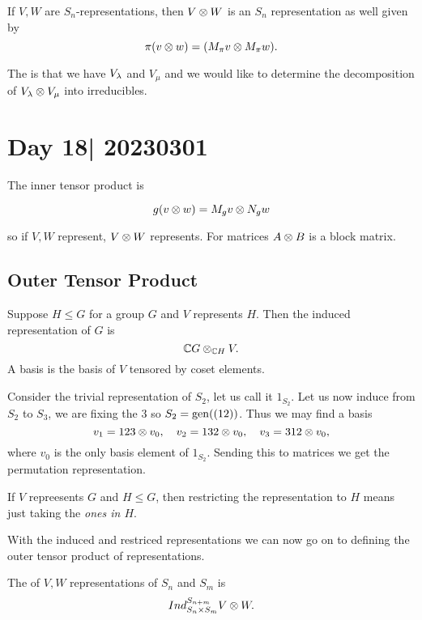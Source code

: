 \documentclass[12pt]{memoir}
\begin{document}
\begin{Prop}
    If $V,W$ are $S_n$-representations, then $V\otimes W$ is an $S_n$ representation as well given by 
    $$\pi(v\otimes w)=(M_\pi v\otimes M_\pi w).$$
\end{Prop}

The  is that we have $V_\lambda$ and $V_\mu$ and we would like to determine the decomposition of $V_\lambda\otimes V_\mu$ into irreducibles.

\section{Day 18| 20230301}

The inner tensor product is 

$$g(v\otimes w)=M_gv\otimes N_gw$$

so if $V,W$ represent, $V\otimes W$ represents. For matrices $A\otimes B$ is a block matrix.

\subsection{Outer Tensor Product}

\begin{Def}
    Suppose $H\leq G$ for a group $G$ and $V$ represents $H$. Then the induced representation of $G$ is 
    $$\mathbb{C} G\otimes_{\mathbb{C} H}V.$$ 
    A basis is the basis of $V$ tensored by coset elements.
\end{Def}

\begin{Ex}
    Consider the trivial representation of $S_2$, let us call it $1_{S_2}$. Let us now induce from $S_2$ to $S_3$, we are fixing the $3$ so $S_2=\operatorname{gen}((12))$. Thus we may find a basis 
    $$v_1=123\otimes v_0,\quad v_2=132\otimes v_0,\quad v_3=312\otimes v_0,$$
    where $v_0$ is the only basis element of $1_{S_2}$. Sending this to matrices we get the permutation representation.
\end{Ex}

\begin{Def}
    If $V$ repreesents $G$ and $H\leq G$, then restricting the representation to $H$ means just taking the \emph{ones in $H$}.
\end{Def}

With the induced and restriced representations we can now go on to defining the outer tensor product of representations.

\begin{Def}
    The  of $V,W$ representations of $S_n$ and $S_m$ is 
    $$Ind_{S_n\times S_m}^{S_{n+m}}V\otimes W.$$ 
\end{Def}
\end{document}
